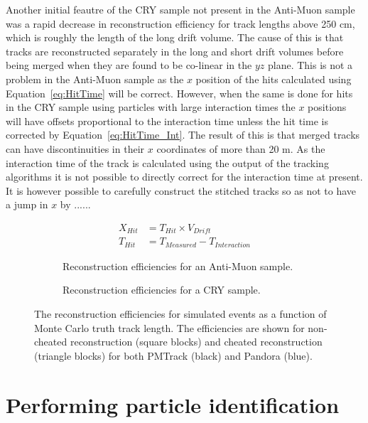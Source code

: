 Another initial feautre of the CRY sample not present in the Anti-Muon sample was a rapid decrease in reconstruction efficiency for track lengths above 250 cm, which is roughly the length of the long drift volume. The cause of this is that tracks are reconstructed separately in the long and short drift volumes before being merged when they are found to be co-linear in the $yz$ plane. This is not a problem in the Anti-Muon sample as the $x$ position of the hits calculated using Equation~\ref{eq:HitTime} will be correct. However, when the same is done for hits in the CRY sample using particles with large interaction times the $x$ positions will have offsets proportional to the interaction time unless the hit time is corrected by Equation~\ref{eq:HitTime_Int}. The result of this is that merged tracks can have discontinuities in their $x$ coordinates of more than 20 m. As the interaction time of the track is calculated using the output of the tracking algorithms it is not possible to directly correct for the interaction time at present. It is however possible to carefully construct the stitched tracks so as not to have a jump in $x$ by ......

\begin{subequations} \begin{align}
  X_{Hit} &= T_{Hit} \times V_{Drift} \label{eq:HitTime} \\
  T_{Hit} &= T_{Measured} - T_{Interaction} \label{eq:HitTime_Int}
\end{align} \end{subequations}

\begin{figure}[h!]
  \centering
  \begin{subfigure}{0.45\textwidth}
    \centering
    \caption{Reconstruction efficiencies for an Anti-Muon sample.}
    \label{fig:SimEffic_Length_Before}
  \end{subfigure}
  \hspace{0.08\textwidth}
  \begin{subfigure}{0.45\textwidth}
    \centering
    \caption{Reconstruction efficiencies for a CRY sample.}
    \label{fig:SimEffic_Length_After}
  \end{subfigure}
  \caption[The reconstruction efficiencies for simulated events as a function of Monte Carlo truth track length.]
          {The reconstruction efficiencies for simulated events as a function of Monte Carlo truth track length. The efficiencies are shown for non-cheated reconstruction (square blocks) and cheated reconstruction (triangle blocks) for both PMTrack (black) and Pandora (blue).}
          \label{fig:SimEffic_Length}
\end{figure}

\section{Performing particle identification}  %

